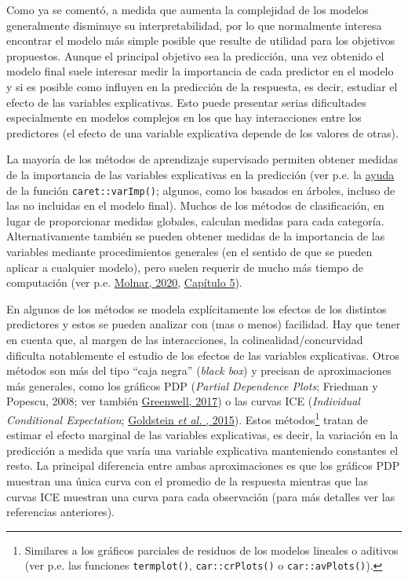 \documentclass[
]{book}
\theoremstyle{break}
\theoremstyle{definition}
\theoremstyle{definition}
\theoremstyle{definition}
\theoremstyle{remark}
\begin{document}
Como ya se comentó, a medida que aumenta la complejidad de los modelos generalmente disminuye su interpretabilidad, por lo que normalmente interesa encontrar el modelo más simple posible que resulte de utilidad para los objetivos propuestos.
Aunque el principal objetivo sea la predicción, una vez obtenido el modelo final suele interesar medir la importancia de cada predictor en el modelo y si es posible como influyen en la predicción de la respuesta, es decir, estudiar el efecto de las variables explicativas.
Esto puede presentar serias dificultades especialmente en modelos complejos en los que hay interacciones entre los predictores (el efecto de una variable explicativa depende de los valores de otras).

La mayoría de los métodos de aprendizaje supervisado permiten obtener medidas de la importancia de las variables explicativas en la predicción (ver p.e. la \href{https://topepo.github.io/caret/variable-importance.html}{ayuda} de la función \texttt{caret::varImp()}; algunos, como los basados en árboles, incluso de las no incluidas en el modelo final).
Muchos de los métodos de clasificación, en lugar de proporcionar medidas globales, calculan medidas para cada categoría.
Alternativamente también se pueden obtener medidas de la importancia de las variables mediante procedimientos generales (en el sentido de que se pueden aplicar a cualquier modelo), pero suelen requerir de mucho más tiempo de computación (ver p.e. \href{https://christophm.github.io/interpretable-ml-book}{Molnar, 2020}, \href{https://christophm.github.io/interpretable-ml-book/agnostic.htm}{Capítulo 5}).

En algunos de los métodos se modela explícitamente los efectos de los distintos predictores y estos se pueden analizar con (mas o menos) facilidad.
Hay que tener en cuenta que, al margen de las interacciones, la colinealidad/concurvidad dificulta notablemente el estudio de los efectos de las variables explicativas.
Otros métodos son más del tipo ``caja negra'' (\emph{black box}) y precisan de aproximaciones más generales, como los gráficos PDP (\emph{Partial Dependence Plots}; Friedman y Popescu, 2008; ver también \href{https://journal.r-project.org/archive/2017/RJ-2017-016/index.html}{Greenwell, 2017}) o las curvas ICE (\emph{Individual Conditional Expectation}; \href{https://doi.org/10.1080/10618600.2014.907095}{Goldstein \emph{et al.} , 2015}).
Estos métodos\footnote{Similares a los gráficos parciales de residuos de los modelos lineales o aditivos (ver p.e. las funciones \texttt{termplot()}, \texttt{car::crPlots()} o \texttt{car::avPlots()}).} tratan de estimar el efecto marginal de las variables explicativas, es decir, la variación en la predicción a medida que varía una variable explicativa manteniendo constantes el resto.
La principal diferencia entre ambas aproximaciones es que los gráficos PDP muestran una única curva con el promedio de la respuesta mientras que las curvas ICE muestran una curva para cada observación (para más detalles ver las referencias anteriores).
\end{document}
